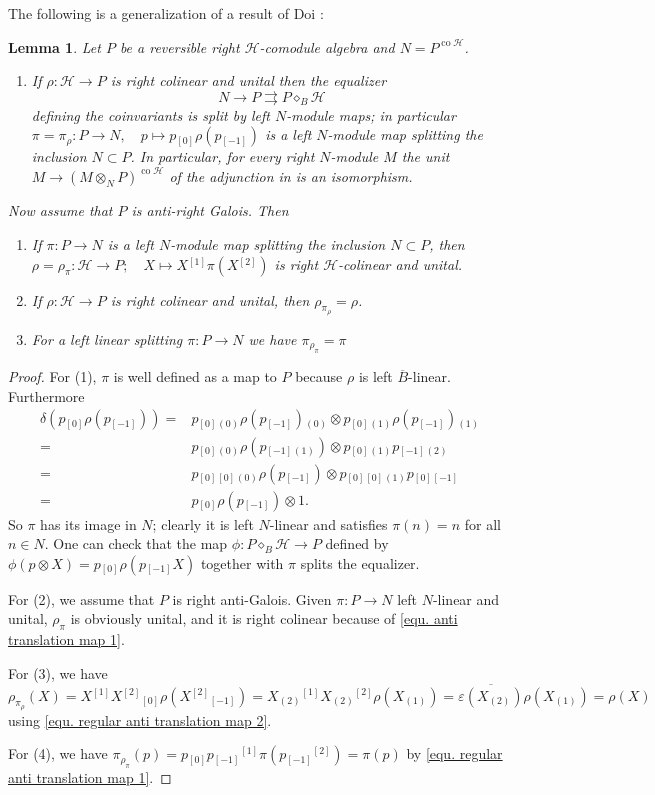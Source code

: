 \documentclass[a4paper,reqno]{amsart}
\numberwithin{equation}{section}
\theoremstyle{plain}
\newtheorem{lem}[thm]{Lemma}
\theoremstyle{remark}
\numberwithin{equation}{section}
\newcommand{\ot}{\otimes}
\newcommand\ol{\overline}
\newcommand{\yi}[1]{{#1}{}{}^{\scriptscriptstyle{[1]}}}
\newcommand{\er}[1]{{#1}{}{}^{\scriptscriptstyle{[2]}}}
\newcommand{\z}{{}_{\scriptscriptstyle{(0)}}}
\newcommand{\rz}{{}_{\scriptscriptstyle{[0]}}}
\renewcommand{\o}{{}_{\scriptscriptstyle{(1)}}}
\newcommand{\rmo}{{}_{\scriptscriptstyle{[-1]}}}
\renewcommand{\t}{{}_{\scriptscriptstyle{(2)}}}
\newcommand{\di}{{\diamond_{B}}}
\newcommand\ou[1]{\otimes_{#1}}
\newcommand{\CH}{\mathcal{H}}
\newcommand\co{{\operatorname{co}}}
\begin{document}
The following is  a generalization of a result of Doi \cite{Doi}:
\begin{lem}\label{Doi-integrals}
Let $P$ be a  reversible right $\CH$-comodule algebra and $N=P^{\co\CH}$.
\begin{enumerate}
    \item If $\rho\colon \CH\to P$ is right colinear and unital  then the equalizer
    \[N\to P\rightrightarrows P\di\CH\]
    defining the coinvariants is split by left $N$-module maps; in particular 
    $\pi=\pi_\rho\colon P\to N, \quad p\mapsto p\rz\rho(p\rmo)$ is a left $N$-module map splitting the inclusion $N\subset P$. In particular, for every right $N$-module $M$ the unit $M\to (M\ou NP)^{\co\CH}$ of the adjunction in  is an isomorphism.
    \end{enumerate}
    Now assume that $P$ is anti-right Galois. Then
    \begin{enumerate}[resume]
    \item If $\pi\colon P\to N$ is a left $N$-module map splitting the inclusion $N\subset P$, then 
    $\rho=\rho_\pi\colon\CH\to P;\quad X\mapsto X\yi{}\pi(X\er{})$ is right $\CH$-colinear and unital. 
    \item If $\rho\colon\CH\to P$ is right colinear and unital, then $\rho_{\pi_\rho}=\rho$.
    \item For a left linear splitting $\pi\colon P\to N$ we have $\pi_{\rho_\pi}=\pi$
\end{enumerate}
\end{lem}
\begin{proof}
For (1),    $\pi$ is well defined as a map to $P$ because $\rho$ is left $\ol B $-linear. Furthermore
\begin{align*}
\delta(p\rz\rho(p\rmo))=&p\rz\z\rho(p\rmo)\z\ot p\rz\o\rho(p\rmo)\o\\
    =&p\rz\z\rho(p\rmo\o)\ot p\rz\o p\rmo\t\\
    =&p\rz\rz\z\rho(p\rmo)\ot p\rz\rz\o p\rz\rmo\\
    =&p\rz\rho(p\rmo)\ot 1.
\end{align*}
So $\pi$  has its image in $N$; clearly it is left $N$-linear and satisfies $\pi(n)=n$ for all $n\in N$. One can check that the map $\phi\colon P\di\CH\to P$ defined by $\phi(p\ot X)=p\rz\rho(p\rmo X)$ together with $\pi$ splits the equalizer. 

For (2), we assume that $P$ is right anti-Galois. Given $\pi\colon P\to N$ left $N$-linear and unital, $\rho_\pi$ is obviously unital, and it is right colinear because of \cref{equ. anti translation map 1}.

For (3), we have $\rho_{\pi_\rho}(X)=X\yi{}{X\er{}}\rz\rho({X\er{}}\rmo)=\yi{X\t}\er{X\t}\rho( X\o)=\ol{\varepsilon(X\t)}\rho(X\o)=\rho(X)$
using \eqref{equ. regular anti translation map 2}.

For (4), we  have $\pi_{\rho_\pi}(p)=p\rz\yi{p\rmo}\pi(\er{p\rmo})=\pi(p)$ by \eqref{equ. regular anti translation map 1}. 
\end{proof}
\end{document}
